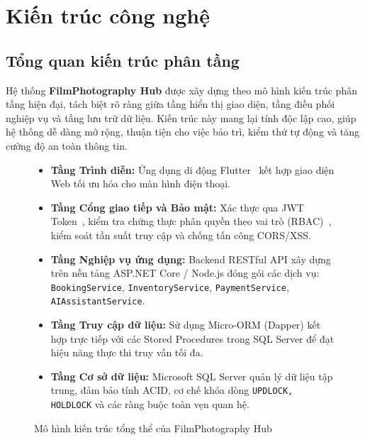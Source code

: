 \section{Kiến trúc công nghệ}

\subsection{Tổng quan kiến trúc phân tầng}
Hệ thống \textbf{FilmPhotography Hub} được xây dựng theo mô hình kiến trúc phân tầng hiện đại, tách biệt rõ ràng giữa tầng hiển thị giao diện, tầng điều phối nghiệp vụ và tầng lưu trữ dữ liệu. Kiến trúc này mang lại tính độc lập cao, giúp hệ thống dễ dàng mở rộng, thuận tiện cho việc bảo trì, kiểm thử tự động và tăng cường độ an toàn thông tin.

\begin{figure}[H]
\centering
\begin{tcolorbox}[colback=blue!5!white,colframe=blue!80!black,title=\textbf{MÔ HÌNH KIẾN TRÚC PHÂN TẦNG CỦA HỆ THỐNG}]
\begin{itemize}[leftmargin=1.5em]
    \item \textbf{Tầng Trình diễn:} 
    Ứng dụng di động Flutter~\cite{alzewairi2024critical} kết hợp giao diện Web tối ưu hóa cho màn hình điện thoại.
    \item \textbf{Tầng Cổng giao tiếp và Bảo mật:}
    Xác thực qua JWT Token~\cite{nugraha2023performance}, kiểm tra chứng thực phân quyền theo vai trò (RBAC)~\cite{sandhu2023role}, kiểm soát tần suất truy cập và chống tấn công CORS/XSS.
    \item \textbf{Tầng Nghiệp vụ ứng dụng:}
    Backend RESTful API xây dựng trên nền tảng ASP.NET Core / Node.js đóng gói các dịch vụ: \texttt{BookingService}, \texttt{InventoryService}, \texttt{PaymentService}, \texttt{AIAssistantService}.
    \item \textbf{Tầng Truy cập dữ liệu:}
    Sử dụng Micro-ORM (Dapper) kết hợp trực tiếp với các Stored Procedures trong SQL Server để đạt hiệu năng thực thi truy vấn tối đa.
    \item \textbf{Tầng Cơ sở dữ liệu:}
    Microsoft SQL Server quản lý dữ liệu tập trung, đảm bảo tính ACID, cơ chế khóa dòng \texttt{UPDLOCK, HOLDLOCK} và các ràng buộc toàn vẹn quan hệ.
\end{itemize}
\end{tcolorbox}
\caption{Mô hình kiến trúc tổng thể của FilmPhotography Hub}
\end{figure}

